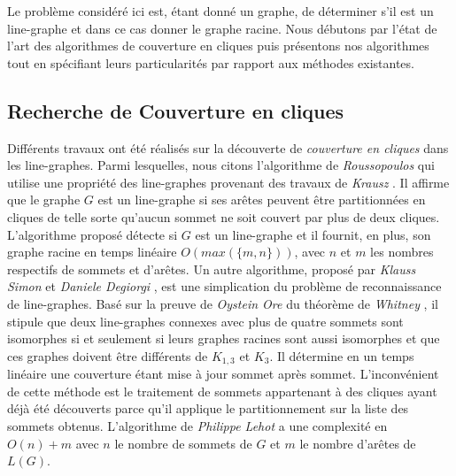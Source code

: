 

Le probl\`eme consid\'er\'e ici est, 
\'etant donn\'e un graphe, de d\'eterminer s'il est un line-graphe et dans ce cas donner le graphe racine.
Nous d\'ebutons par l'\'etat de l'art des algorithmes de couverture en cliques puis pr\'esentons nos algorithmes tout en sp\'ecifiant leurs particularit\'es par rapport aux m\'ethodes existantes. 

\subsection{Recherche de Couverture en cliques}
Diff\'erents travaux ont \'et\'e r\'ealis\'es sur la d\'ecouverte de {\em couverture en cliques} dans les line-graphes.
Parmi lesquelles, nous citons  l'algorithme de {\em Roussopoulos}  \cite{ROUSSOPOULOS1973108} qui utilise une propri\'et\'e des line-graphes provenant des travaux de {\em Krausz} \cite{krausz1943demonstration}. 
Il affirme que le graphe $G$ est un line-graphe si ses ar\^etes  peuvent \^etre partitionn\'ees en cliques  de telle sorte qu'aucun sommet ne soit couvert par plus de deux cliques. 
L'algorithme propos\'e d\'etecte si $G$ est un line-graphe et il fournit, en plus, son graphe racine en temps lin\'eaire $O(max(\{m,n\}))$, avec $n$ et $m$ les nombres respectifs de sommets et d'ar\^etes.
\newline
Un autre algorithme, propos\'e par {\em Klauss Simon} et {\em Daniele Degiorgi} \cite{decompositionEnCliques}, est une simplication du probl\`eme de reconnaissance de line-graphes. Bas\'e sur la preuve de {\em Oystein Ore} du th\'eor\`eme de {\em Whitney} \cite{whitney1932congruent}, il stipule que deux line-graphes connexes avec plus de quatre sommets sont isomorphes si et seulement si leurs graphes racines sont aussi isomorphes et que ces graphes  doivent \^etre diff\'erents de $K_{1,3}$ et $K_3$. Il d\'etermine en un temps lin\'eaire une couverture \'etant mise \`a jour sommet apr\`es sommet. 
L'inconv\'enient de cette m\'ethode est le traitement de sommets appartenant \`a des cliques ayant d\'ej\`a \'et\'e d\'ecouverts parce qu'il applique le partitionnement sur la liste des sommets obtenus.
\newline
L'algorithme de {\em Philippe Lehot} \cite{decompositionEnCliquesParArcs} a une complexit\'e en $O(n) + m$ avec $n$ le nombre de sommets de $G$ et $m$ le nombre d'ar\^etes de $L(G)$.
